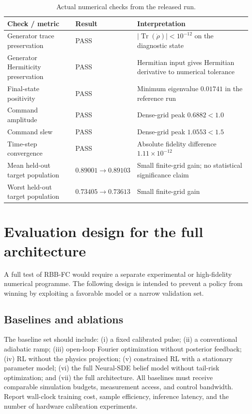 \documentclass[10pt,twoside]{article}
\DeclareMathOperator{\Tr}{Tr}
\begin{document}
\begin{table}[t]
\centering\small
\caption{Actual numerical checks from the released run.}
\label{tab:results}
\begin{tabularx}{\textwidth}{p{}p{}X}
\toprule
Check / metric & Result & Interpretation \\
\midrule
Generator trace preservation & PASS & $|\Tr(\dot\rho)|<10^{-12}$ on the diagnostic state \\
Generator Hermiticity preservation & PASS & Hermitian input gives Hermitian derivative to numerical tolerance \\
Final-state positivity & PASS & Minimum eigenvalue $0.01741$ in the reference run \\
Command amplitude & PASS & Dense-grid peak $0.6882<1.0$ \\
Command slew & PASS & Dense-grid peak $1.0553<1.5$ \\
Time-step convergence & PASS & Absolute fidelity difference $1.11\times10^{-12}$ \\
Mean held-out target population & $0.89001\rightarrow0.89103$ & Small finite-grid gain; no statistical significance claim \\
Worst held-out target population & $0.73405\rightarrow0.73613$ & Small finite-grid gain \\
\bottomrule
\end{tabularx}
\end{table}

\section{Evaluation design for the full architecture}

A full test of RBB-FC would require a separate experimental or high-fidelity numerical programme. The following design is intended to prevent a policy from winning by exploiting a favorable model or a narrow validation set.

\subsection{Baselines and ablations}

The baseline set should include: (i) a fixed calibrated pulse; (ii) a conventional adiabatic ramp; (iii) open-loop Fourier optimization without posterior feedback; (iv) RL without the physics projection; (v) constrained RL with a stationary parameter model; (vi) the full Neural-SDE belief model without tail-risk optimization; and (vii) the full architecture. All baselines must receive comparable simulation budgets, measurement access, and control bandwidth. Report wall-clock training cost, sample efficiency, inference latency, and the number of hardware calibration experiments.
\end{document}
